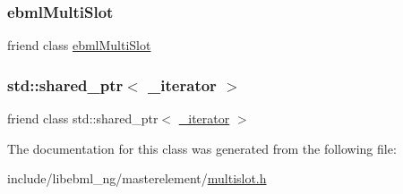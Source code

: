 \subsubsection{\texorpdfstring{ebml\+Multi\+Slot}{ebmlMultiSlot}}
{\footnotesize\ttfamily friend class \mbox{\hyperlink{classebml_1_1ebmlMultiSlot}{ebml\+Multi\+Slot}}\hspace{0.3cm}{\ttfamily [friend]}}

\mbox{\label{classebml_1_1ebmlMultiSlot_1_1__iterator_a6c39add7736de258762e32f3536f516a}} 
\subsubsection{\texorpdfstring{std\+::shared\+\_\+ptr$<$ \+\_\+iterator $>$}{std::shared\_ptr< \_iterator >}}
{\footnotesize\ttfamily friend class std\+::shared\+\_\+ptr$<$ \mbox{\hyperlink{classebml_1_1ebmlMultiSlot_1_1__iterator}{\+\_\+iterator}} $>$\hspace{0.3cm}{\ttfamily [friend]}}



The documentation for this class was generated from the following file\+:\begin{DoxyCompactItemize}
\item 
include/libebml\+\_\+ng/masterelement/\mbox{\hyperlink{multislot_8h}{multislot.\+h}}\end{DoxyCompactItemize}
